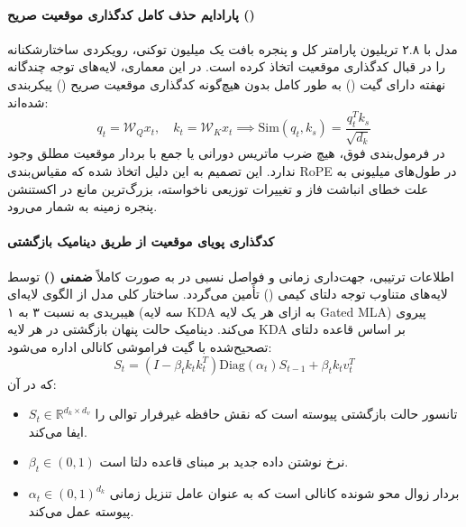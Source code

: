 \item {}

\paragraph*{پارادایم حذف کامل کدگذاری موقعیت صریح ()}
مدل  \cite{kimi2026k3} با ۲.۸ تریلیون پارامتر کل و پنجره بافت یک میلیون توکنی، رویکردی ساختارشکنانه را در قبال کدگذاری موقعیت اتخاذ کرده است. در این معماری، لایه‌های توجه چندگانه نهفته دارای گیت () به طور کامل بدون هیچ‌گونه کدگذاری موقعیت صریح () پیکربندی شده‌اند:
\begin{equation}
    q_t = \mathcal{W}_Q x_t, \quad k_t = \mathcal{W}_K x_t \implies \text{Sim}(q_t, k_s) = \frac{q_t^T k_s}{\sqrt{d_k}}
\end{equation}
در فرمول‌بندی فوق، هیچ ضرب ماتریس دورانی یا جمع با بردار موقعیت مطلق وجود ندارد. این تصمیم به این دلیل اتخاذ شده که مقیاس‌بندی RoPE در طول‌های میلیونی به علت خطای انباشت فاز و تغییرات توزیعی ناخواسته، بزرگ‌ترین مانع در اکستنشن پنجره زمینه به شمار می‌رود.

\paragraph*{کدگذاری پویای موقعیت از طریق دینامیک بازگشتی }
اطلاعات ترتیبی، جهت‌داری زمانی و فواصل نسبی در  به صورت کاملاً \textbf{ضمنی ()} توسط لایه‌های متناوب توجه دلتای کیمی () تأمین می‌گردد. ساختار کلی مدل از الگوی لایه‌ای هیبریدی به نسبت ۳ به ۱ (سه لایه KDA به ازای هر یک لایه Gated MLA) پیروی می‌کند. دینامیک حالت پنهان بازگشتی در هر لایه KDA بر اساس قاعده دلتای تصحیح‌شده با گیت فراموشی کانالی اداره می‌شود:
\begin{equation}
    S_t = \left( I - \beta_t k_t k_t^T \right) \text{Diag}(\alpha_t) S_{t-1} + \beta_t k_t v_t^T
\end{equation}
که در آن:
\begin{itemize}
    \item $S_t \in \mathbb{R}^{d_k \times d_v}$ تانسور حالت بازگشتی پیوسته است که نقش حافظه غیرفرار توالی را ایفا می‌کند.
    \item $\beta_t \in (0, 1)$ نرخ نوشتن داده جدید بر مبنای قاعده دلتا است.
    \item $\alpha_t \in (0, 1)^{d_k}$ بردار زوال محو شونده کانالی است که به عنوان عامل تنزیل زمانی پیوسته عمل می‌کند.
\end{itemize}

